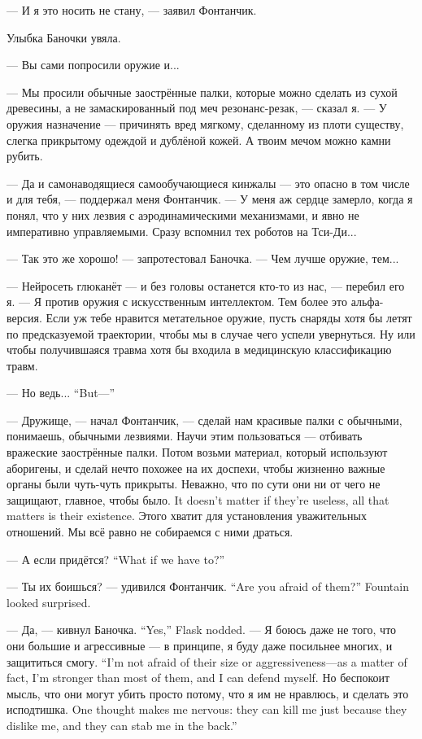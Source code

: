 --- И я это носить не стану, --- заявил Фонтанчик.

Улыбка Баночки увяла.

--- Вы сами попросили оружие и...

--- Мы просили обычные заострённые палки, которые можно сделать из сухой древесины, а не замаскированный под меч резонанс-резак, --- сказал я.
--- У оружия назначение --- причинять вред мягкому, сделанному из плоти существу, слегка прикрытому одеждой и дублёной кожей.
А твоим мечом можно камни рубить.

--- Да и самонаводящиеся самообучающиеся кинжалы --- это опасно в том числе и для тебя, --- поддержал меня Фонтанчик.
--- У меня аж сердце замерло, когда я понял, что у них лезвия с аэродинамическими механизмами, и явно не императивно управляемыми.
Сразу вспомнил тех роботов на Тси-Ди...

--- Так это же хорошо! --- запротестовал Баночка.
--- Чем лучше оружие, тем...

--- Нейросеть глюканёт --- и без головы останется кто-то из нас, --- перебил его я.
--- Я против оружия с искусственным интеллектом.
Тем более это альфа-версия.
Если уж тебе нравится метательное оружие, пусть снаряды хотя бы летят по предсказуемой траектории, чтобы мы в случае чего успели увернуться.
Ну или чтобы получившаяся травма хотя бы входила в медицинскую классификацию травм.

{--- Но ведь...}
{``But---''}

--- Дружище, --- начал Фонтанчик, --- сделай нам красивые палки с обычными, понимаешь, обычными лезвиями.
Научи этим пользоваться --- отбивать вражеские заострённые палки.
Потом возьми материал, который используют аборигены, и сделай нечто похожее на их доспехи, чтобы жизненно важные органы были чуть-чуть прикрыты.
{Неважно, что по сути они ни от чего не защищают, главное, чтобы было.}
{It doesn't matter if they're useless, all that matters is their existence.}
Этого хватит для установления уважительных отношений.
Мы всё равно не собираемся с ними драться.

{--- А если придётся?}
{``What if we have to?''}

{--- Ты их боишься? --- удивился Фонтанчик.}
{``Are you afraid of them?'' Fountain looked surprised.}

{--- Да, --- кивнул Баночка.}
{``Yes,'' Flask nodded.}
{--- Я боюсь даже не того, что они большие и агрессивные --- в принципе, я буду даже посильнее многих, и защититься смогу.}
{``I'm not afraid of their size or aggressiveness---as a matter of fact, I'm stronger than most of them, and I can defend myself.}
{Но беспокоит мысль, что они могут убить просто потому, что я им не нравлюсь, и сделать это исподтишка.}
{One thought makes me nervous: they can kill me just because they dislike me, and they can stab me in the back.''}

